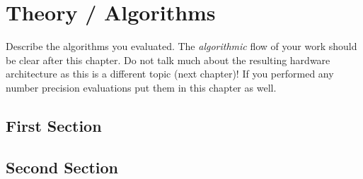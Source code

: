 

\chapter{Theory / Algorithms}
Describe the algorithms you evaluated. The \textit{algorithmic} flow
of your work should be clear after this chapter. Do not talk much
about the resulting hardware architecture as this is a different topic
(next chapter)! If you performed any number precision evaluations put
them in this chapter as well.

\section{First Section}


\section{Second Section}


